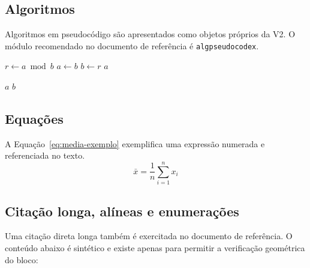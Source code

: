\subsection{Algoritmos}

Algoritmos em pseudocódigo são apresentados como objetos próprios da V2. O módulo recomendado no documento de referência é \texttt{algpseudocodex}.


\label{alg:mdc-numerado}
\begin{ufcalgoritmo}[here][1]
    \State $r \gets a \bmod b$
    \State $a \gets b$
    \State $b \gets r$
  \EndWhile
  \State \Return $a$
\end{ufcalgoritmo}

\label{alg:maior-sem-numero}
\begin{ufcalgoritmo}[here][0]
    \State \Return $a$
  \Else
    \State \Return $b$
  \EndIf
\end{ufcalgoritmo}

\subsection{Equações}

A Equação~\ref{eq:media-exemplo} exemplifica uma expressão numerada e referenciada no texto.
\begin{equation}
  \bar{x} = \frac{1}{n}\sum_{i=1}^{n}x_i
  \label{eq:media-exemplo}
\end{equation}


\subsection{Citação longa, alíneas e enumerações}

Uma citação direta longa também é exercitada no documento de referência. O conteúdo abaixo é sintético e existe apenas para permitir a verificação geométrica do bloco:

